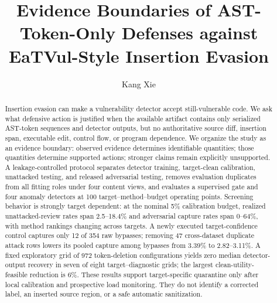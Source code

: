 \documentclass[a4paper,fleqn]{cas-dc}
\begin{document}
\let\WriteBookmarks\relax
\def\floatpagepagefraction{0.8}
\def\textpagefraction{0.05}


\title[mode=title]{Evidence Boundaries of AST-Token-Only Defenses against EaTVul-Style Insertion Evasion}

\author[1]{Kang Xie}
\cormark[1]


\begin{abstract}
Insertion evasion can make a vulnerability detector accept still-vulnerable code. We ask what defensive action is justified when the available artifact contains only serialized AST-token sequences and detector outputs, but no authoritative source diff, insertion span, executable edit, control flow, or program dependence. We organize the study as an evidence boundary: observed evidence determines identifiable quantities; those quantities determine supported actions; stronger claims remain explicitly unsupported. A leakage-controlled protocol separates detector training, target-clean calibration, unattacked testing, and released adversarial testing, removes evaluation duplicates from all fitting roles under four content views, and evaluates a supervised gate and four anomaly detectors at 100 target--method--budget operating points. Screening behavior is strongly target dependent: at the nominal 5\% calibration budget, realized unattacked-review rates span 2.5--18.4\% and adversarial capture rates span 0--64\%, with method rankings changing across targets. A newly executed target-confidence control captures only 12 of 354 raw bypasses; removing 47 cross-dataset duplicate attack rows lowers its pooled capture among bypasses from 3.39\% to 2.82--3.11\%. A fixed exploratory grid of 972 token-deletion configurations yields zero median detector-output recovery in seven of eight target--diagnostic grids; the largest clean-utility-feasible reduction is 6\%. These results support target-specific quarantine only after local calibration and prospective load monitoring. They do not identify a corrected label, an inserted source region, or a safe automatic sanitization.
\end{abstract}
\end{document}
